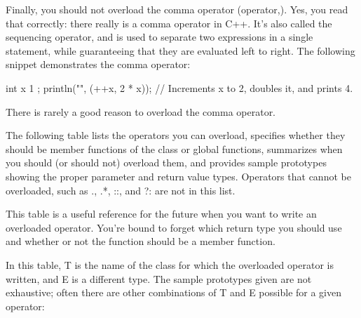 Finally, you should not overload the comma operator (operator,). Yes, you read that correctly: there really is a comma operator in C++. It’s also called the sequencing operator, and is used to separate two expressions in a single statement, while guaranteeing that they are evaluated left to right. The following snippet demonstrates the comma operator:

\begin{cpp}
int x { 1 };
println("{}", (++x, 2 * x)); // Increments x to 2, doubles it, and prints 4.
\end{cpp}

There is rarely a good reason to overload the comma operator.


The following table lists the operators you can overload, specifies whether they should be member functions of the class or global functions, summarizes when you should (or should not) overload them, and provides sample prototypes showing the proper parameter and return value types. Operators that cannot be overloaded, such as ., .*, ::, and ?: are not in this list.

This table is a useful reference for the future when you want to write an overloaded operator. You’re bound to forget which return type you should use and whether or not the function should be a member function.

In this table, T is the name of the class for which the overloaded operator is written, and E is a different type. The sample prototypes given are not exhaustive; often there are other combinations of T and E possible for a given operator:

